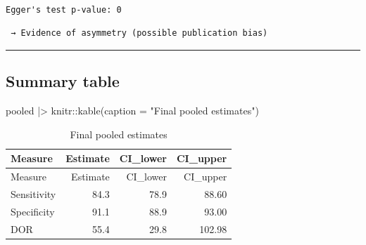 \documentclass[
  letterpaper,
  DIV=11,
  numbers=noendperiod]{scrartcl}
\newenvironment{Shaded}{\begin{snugshade}}{\end{snugshade}}
\newcommand{\AttributeTok}[1]{\textcolor[rgb]{0.40,0.45,0.13}{#1}}
\newcommand{\ControlFlowTok}[1]{\textcolor[rgb]{0.00,0.23,0.31}{\textbf{#1}}}
\newcommand{\FloatTok}[1]{\textcolor[rgb]{0.68,0.00,0.00}{#1}}
\newcommand{\FunctionTok}[1]{\textcolor[rgb]{0.28,0.35,0.67}{#1}}
\newcommand{\NormalTok}[1]{\textcolor[rgb]{0.00,0.23,0.31}{#1}}
\newcommand{\SpecialCharTok}[1]{\textcolor[rgb]{0.37,0.37,0.37}{#1}}
\newcommand{\StringTok}[1]{\textcolor[rgb]{0.13,0.47,0.30}{#1}}
\begin{document}
\begin{verbatim}

Egger's test p-value: 0
\end{verbatim}

\begin{Shaded}
\end{Shaded}

\begin{verbatim}
 → Evidence of asymmetry (possible publication bias)
\end{verbatim}

\begin{center}\rule{0.5\linewidth}{0.5pt}\end{center}

\subsection{Summary table}\label{summary-table}

\begin{Shaded}
\begin{Highlighting}[]
\NormalTok{pooled }\SpecialCharTok{|\textgreater{}}
\NormalTok{  knitr}\SpecialCharTok{::}\FunctionTok{kable}\NormalTok{(}\AttributeTok{caption =} \StringTok{"Final pooled estimates"}\NormalTok{)}
\end{Highlighting}
\end{Shaded}

\begin{longtable}[]{@{}lrrr@{}}
\caption{Final pooled estimates}\tabularnewline
\toprule\noalign{}
Measure & Estimate & CI\_lower & CI\_upper \\
\midrule\noalign{}
\endfirsthead
\toprule\noalign{}
Measure & Estimate & CI\_lower & CI\_upper \\
\midrule\noalign{}
\endhead
\bottomrule\noalign{}
\endlastfoot
Sensitivity & 84.3 & 78.9 & 88.60 \\
Specificity & 91.1 & 88.9 & 93.00 \\
DOR & 55.4 & 29.8 & 102.98 \\
\end{longtable}
\end{document}
